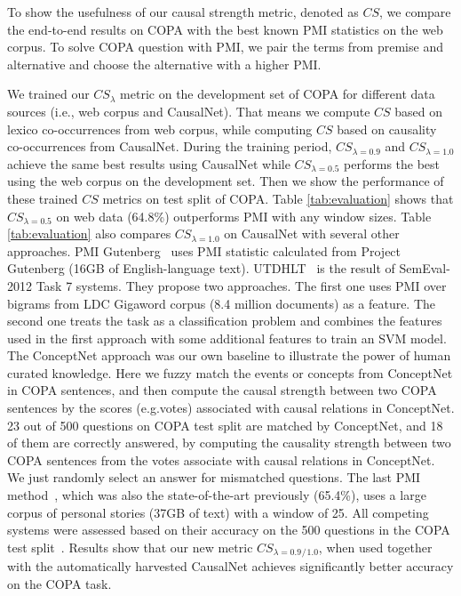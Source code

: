 \documentclass[letterpaper]{article}
\newcommand{\tabref}[1]{Table \ref{#1}}
\begin{document}
To show the usefulness of our causal strength metric, denoted as $CS$,
we compare the end-to-end results on COPA with the
best known PMI statistics on the web corpus.
To solve COPA question with PMI, we pair the terms from
premise and alternative and choose the alternative
with a higher PMI.

We trained our $CS_{\lambda}$ metric
on the development set of COPA
for different data sources (i.e., web corpus and CausalNet).
That means we compute $CS$ based on lexico co-occurrences from web corpus,
while computing $CS$ based on causality co-occurrences from CausalNet.
During the training period,
$CS_{\lambda=0.9}$ and $CS_{\lambda=1.0}$ achieve the same best results
using CausalNet while $CS_{\lambda=0.5}$
performs the best using the web corpus on the development set.
Then we show the performance of these trained $CS$ metrics on test split of COPA.
\tabref{tab:evaluation} shows that
$CS_{\lambda = 0.5}$ on web data
(64.8\%) outperforms PMI with any window sizes.
\tabref{tab:evaluation} also compares $CS_{\lambda=1.0}$ on CausalNet
with several other approaches.
PMI Gutenberg~\cite{roemmele2011choice} uses PMI statistic calculated
from Project Gutenberg (16GB of English-language text).
UTDHLT~\cite{goodwin2012utdhlt} is the
result of SemEval-2012 Task 7 systems. They propose two
approaches. The first one uses PMI over bigrams from LDC Gigaword corpus
(8.4 million documents) as a
feature. The second one treats the task as a classification
problem and combines the features used in the first approach with
some additional features to train an SVM model.
The ConceptNet approach was our own baseline to illustrate the power of
human curated knowledge. Here we fuzzy match
the events or concepts from ConceptNet in COPA sentences, and then compute
the causal strength between two COPA sentences by the scores (e.g.votes)
associated with
causal relations in ConceptNet.
23 out of 500 questions
on COPA test split are matched by ConceptNet,
and 18 of them are correctly answered,
by computing the causality strength between two COPA sentences
from the votes associate with causal relations in ConceptNet.
We just randomly select an answer
for mismatched questions.
The last PMI method~\cite{gordon2011commonsense}, which was also the
state-of-the-art previously (65.4\%), uses a large corpus of
personal stories (37GB of text) with a window of 25.
All competing systems were assessed based
on their accuracy on the 500 questions in the COPA test
split~\cite{gordon2012copa}. Results show that our new metric
$CS_{\lambda=0.9}$$_{/}$$_{1.0}$,
when used together with the automatically harvested CausalNet
achieves significantly better accuracy on the COPA task.
\end{document}
